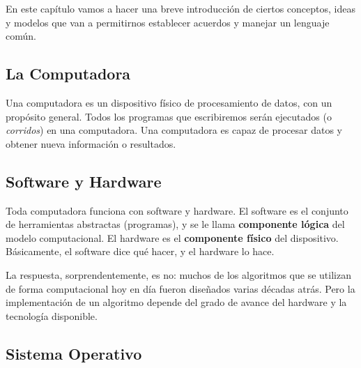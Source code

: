 \documentclass[
  letterpaper,
  DIV=11,
  numbers=noendperiod]{scrreprt}
\begin{document}
En este capítulo vamos a hacer una breve introducción de ciertos
conceptos, ideas y modelos que van a permitirnos establecer acuerdos y
manejar un lenguaje común.

\subsection{La Computadora}\label{la-computadora}

Una computadora es un dispositivo físico de procesamiento de datos, con
un propósito general. Todos los programas que escribiremos serán
ejecutados (o \emph{corridos}) en una computadora. Una computadora es
capaz de procesar datos y obtener nueva información o resultados.

\subsection{Software y Hardware}\label{software-y-hardware}

Toda computadora funciona con software y hardware. El software es el
conjunto de herramientas abstractas (programas), y se le llama
\textbf{componente lógica} del modelo computacional. El hardware es el
\textbf{componente físico} del dispositivo. Básicamente, el software
dice qué hacer, y el hardware lo hace.

\begin{tcolorbox}[enhanced jigsaw, arc=.35mm, toptitle=1mm, colframe=quarto-callout-tip-color-frame, bottomtitle=1mm, opacitybacktitle=0.6, colbacktitle=quarto-callout-tip-color!10!white, leftrule=.75mm, coltitle=black, toprule=.15mm, titlerule=0mm, title=\textcolor{quarto-callout-tip-color}{\faLightbulb}\hspace{0.5em}{\textbf{¿Es indispensable tener una computadora para crear un
algoritmo?}\\
}, bottomrule=.15mm, rightrule=.15mm, colback=white, breakable, opacityback=0, left=2mm]

La respuesta, sorprendentemente, es no: muchos de los algoritmos que se
utilizan de forma computacional hoy en día fueron diseñados varias
décadas atrás. Pero la implementación de un algoritmo depende del grado
de avance del hardware y la tecnología disponible.

\end{tcolorbox}

\subsection{Sistema Operativo}\label{sistema-operativo}
\end{document}
